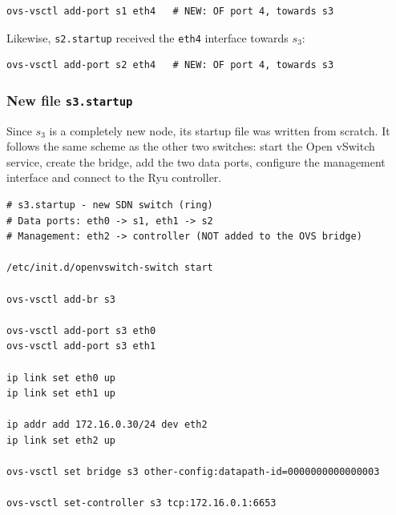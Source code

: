 \documentclass[11pt,a4paper]{article}
\newcommand{\code}[1]{\texttt{#1}}
\begin{document}
\begin{lstlisting}[style=sh,caption={Line added to \texttt{s1.startup}}]
ovs-vsctl add-port s1 eth4   # NEW: OF port 4, towards s3
\end{lstlisting}

Likewise, \code{s2.startup} received the \code{eth4} interface towards $s_3$:

\begin{lstlisting}[style=sh,caption={Line added to \texttt{s2.startup}}]
ovs-vsctl add-port s2 eth4   # NEW: OF port 4, towards s3
\end{lstlisting}

\subsubsection{New file \texttt{s3.startup}}
Since $s_3$ is a completely new node, its startup file was written from scratch.
It follows the same scheme as the other two switches: start the Open vSwitch
service, create the bridge, add the two data ports, configure the management
interface and connect to the Ryu controller.

\begin{lstlisting}[style=sh,caption={Contents of \texttt{s3.startup}}]
# s3.startup - new SDN switch (ring)
# Data ports: eth0 -> s1, eth1 -> s2
# Management: eth2 -> controller (NOT added to the OVS bridge)

/etc/init.d/openvswitch-switch start

ovs-vsctl add-br s3

ovs-vsctl add-port s3 eth0
ovs-vsctl add-port s3 eth1

ip link set eth0 up
ip link set eth1 up

ip addr add 172.16.0.30/24 dev eth2
ip link set eth2 up

ovs-vsctl set bridge s3 other-config:datapath-id=0000000000000003

ovs-vsctl set-controller s3 tcp:172.16.0.1:6653
\end{lstlisting}
\end{document}
